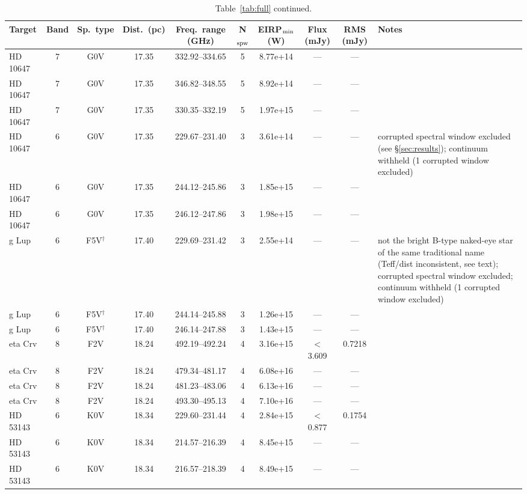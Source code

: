 \documentclass{openjournal}
\begin{document}
\begin{table}
\centering
\scriptsize
\caption{Table~\ref{tab:full} continued.}
\label{tab:full5}
\begin{tabularx}{\textwidth}{@{}l c c c c c c c c X@{}}
\hline
Target & Band & Sp.\ type & Dist.\ (pc) & Freq.\ range (GHz) & N$_{\rm spw}$ & EIRP$_{\rm min}$ (W) & Flux (mJy) & RMS (mJy) & Notes \\
\hline
HD 10647 & 7 & G0V & 17.35 & 332.92--334.65 & 5 & 8.77e+14 & --- & --- &  \\
HD 10647 & 7 & G0V & 17.35 & 346.82--348.55 & 5 & 8.92e+14 & --- & --- &  \\
HD 10647 & 7 & G0V & 17.35 & 330.35--332.19 & 5 & 1.97e+15 & --- & --- &  \\
HD 10647 & 6 & G0V & 17.35 & 229.67--231.40 & 3 & 3.61e+14 & --- & --- & corrupted spectral window excluded (see \S\ref{sec:results}); continuum withheld (1 corrupted window excluded) \\
HD 10647 & 6 & G0V & 17.35 & 244.12--245.86 & 3 & 1.85e+15 & --- & --- &  \\
HD 10647 & 6 & G0V & 17.35 & 246.12--247.86 & 3 & 1.98e+15 & --- & --- &  \\
g Lup & 6 & F5V$^\dagger$ & 17.40 & 229.69--231.42 & 3 & 2.55e+14 & --- & --- & not the bright B-type naked-eye star of the same traditional name (Teff/dist inconsistent, see text); corrupted spectral window excluded; continuum withheld (1 corrupted window excluded) \\
g Lup & 6 & F5V$^\dagger$ & 17.40 & 244.14--245.88 & 3 & 1.26e+15 & --- & --- &  \\
g Lup & 6 & F5V$^\dagger$ & 17.40 & 246.14--247.88 & 3 & 1.43e+15 & --- & --- &  \\
eta Crv & 8 & F2V & 18.24 & 492.19--492.24 & 4 & 3.16e+15 & $<$3.609 & 0.7218 &  \\
eta Crv & 8 & F2V & 18.24 & 479.34--481.17 & 4 & 6.08e+16 & --- & --- &  \\
eta Crv & 8 & F2V & 18.24 & 481.23--483.06 & 4 & 6.13e+16 & --- & --- &  \\
eta Crv & 8 & F2V & 18.24 & 493.30--495.13 & 4 & 7.10e+16 & --- & --- &  \\
HD 53143 & 6 & K0V & 18.34 & 229.60--231.44 & 4 & 2.84e+15 & $<$0.877 & 0.1754 &  \\
HD 53143 & 6 & K0V & 18.34 & 214.57--216.39 & 4 & 8.45e+15 & --- & --- &  \\
HD 53143 & 6 & K0V & 18.34 & 216.57--218.39 & 4 & 8.49e+15 & --- & --- &  \\

\end{tabularx}
\end{table}
\end{document}
